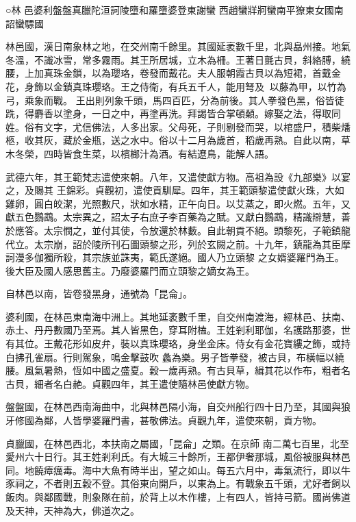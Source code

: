 
\begin{pinyinscope}

 ○林
 邑婆利盤盤真臘陀洹訶陵墮和羅墮婆登東謝蠻
 西趙蠻牂牁蠻南平獠東女國南詔蠻驃國



 林邑國，漢日南象林之地，在交州南千餘里。其國延袤數千里，北與皛州接。地氣冬溫，不識冰雪，常多霧雨。其王所居城，立木為柵。王著日氈古貝，斜絡膊，繞腰，上加真珠金鎖，以為瓔珞，卷發而戴花。夫人服朝霞古貝以為短裙，首戴金花，身飾以金鎖真珠瓔珞。王之侍衛，有兵五千人，能用弩及，以藤為甲，以竹為弓，乘象而戰。
 王出則列象千頭，馬四百匹，分為前後。其人拳發色黑，俗皆徒跣，得麝香以塗身，一日之中，再塗再洗。拜謁皆合掌頓顙。嫁娶之法，得取同姓。俗有文字，尤信佛法，人多出家。父母死，子則剔發而哭，以棺盛尸，積柴燔柩，收其灰，藏於金瓶，送之水中。俗以十二月為歲首，稻歲再熟。自此以南，草木冬榮，四時皆食生菜，以檳榔汁為酒。有結遼鳥，能解人語。



 武德六年，其王範梵志遣使來朝。八年，又遣使獻方物。高祖為設《九部樂》以宴之，及賜其
 王錦彩。貞觀初，遣使貢馴犀。四年，其王範頭黎遣使獻火珠，大如雞卵，圓白皎潔，光照數尺，狀如水精，正午向日。以艾蒸之，即火燃。五年，又獻五色鸚鵡。太宗異之，詔太子右庶子李百藥為之賦。又獻白鸚鵡，精識辯慧，善於應答。太宗憫之，並付其使，令放還於林藪。自此朝貢不絕。頭黎死，子範鎮龍代立。太宗崩，詔於陵所刊石圖頭黎之形，列於玄闕之前。十九年，鎮龍為其臣摩訶漫多伽獨所殺，其宗族並誅夷，範氏遂絕。國人乃立頭黎
 之女婿婆羅門為王。後大臣及國人感思舊主。乃廢婆羅門而立頭黎之嫡女為王。



 自林邑以南，皆卷發黑身，通號為「昆侖」。



 婆利國，在林邑東南海中洲上。其地延袤數千里，自交州南渡海，經林邑、扶南、赤土、丹丹數國乃至焉。其人皆黑色，穿耳附榼。王姓剎利耶伽，名護路那婆，世有其位。王戴花形如皮弁，裝以真珠瓔珞，身坐金床。侍女有金花寶縷之飾，或持白拂孔雀扇。行則駕象，鳴金擊鼓吹
 蠡為樂。男子皆拳發，被古貝，布橫幅以繞腰。風氣暑熱，恆如中國之盛夏。穀一歲再熟。有古貝草，緝其花以作布，粗者名古貝，細者名白赩。貞觀四年，其王遣使隨林邑使獻方物。



 盤盤國，在林邑西南海曲中，北與林邑隔小海，自交州船行四十日乃至，其國與狼牙修國為鄰，人皆學婆羅門書，甚敬佛法。貞觀九年，遣使來朝，貢方物。



 貞臘國，在林邑西北，本扶南之屬國，「昆侖」之類。在京師
 南二萬七百里，北至愛州六十日行。其王姓剎利氏。有大城三十餘所，王都伊奢那城，風俗被服與林邑同。地饒瘴癘毒。海中大魚有時半出，望之如山。每五六月中，毒氣流行，即以牛豕祠之，不者則五穀不登。其俗東向開戶，以東為上。有戰象五千頭，尤好者飼以飯肉。與鄰國戰，則象隊在前，於背上以木作樓，上有四人，皆持弓箭。國尚佛道及天神，天神為大，佛道次之。




\end{pinyinscope}
